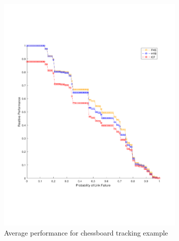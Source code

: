 \documentclass[journal]{IEEEtran}
\theoremstyle{remark}
\theoremstyle{definition}
\begin{document}
\begin{figure}
	\begin{subfigure}{0.50\textwidth}
		\includegraphics[width=\linewidth]{./CaseC_FigPerf_Chessboard_RndNet.pdf}
		\caption{Average performance for chessboard tracking example} \label{fig:1a}
	\end{subfigure}
	\hspace*{\fill} %
	\begin{subfigure}{0.50\textwidth}

\end{subfigure}
\end{figure}
\end{document}
